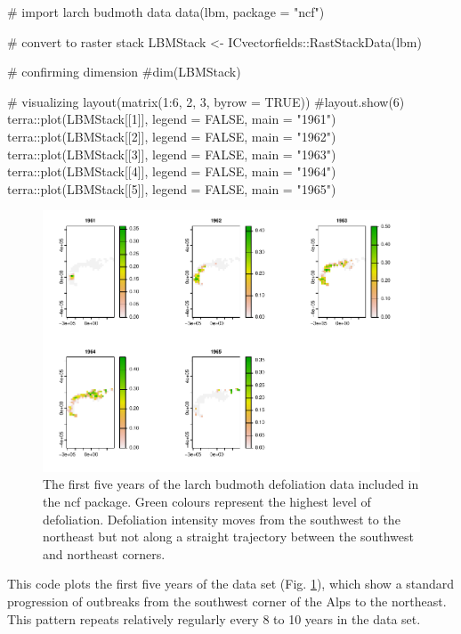 \begin{Schunk}
\begin{Sinput}
# import larch budmoth data
data(lbm, package = "ncf")

# convert to raster stack
LBMStack <- ICvectorfields::RastStackData(lbm)

# confirming dimension
#dim(LBMStack)

# visualizing
layout(matrix(1:6, 2, 3, byrow = TRUE))
#layout.show(6)
terra::plot(LBMStack[[1]], legend = FALSE, main = "1961")
terra::plot(LBMStack[[2]], legend = FALSE, main = "1962")
terra::plot(LBMStack[[3]], legend = FALSE, main = "1963")
terra::plot(LBMStack[[4]], legend = FALSE, main = "1964")
terra::plot(LBMStack[[5]], legend = FALSE, main = "1965")
\end{Sinput}
\begin{figure}
\includegraphics{ImageCorrelationVFv2_files/figure-latex/4-1} \caption[The first five years of the larch budmoth defoliation data included in the ncf package]{The first five years of the larch budmoth defoliation data included in the ncf package. Green colours represent the highest level of defoliation. Defoliation intensity moves from the southwest to the northeast but not along a straight trajectory between the southwest and northeast corners.}\label{fig:4}
\end{figure}
\end{Schunk}

This code plots the first five years of the data set (Fig. \ref{fig:4}),
which show a standard progression of outbreaks from the southwest corner
of the Alps to the northeast. This pattern repeats relatively regularly
every 8 to 10 years in the data set.

